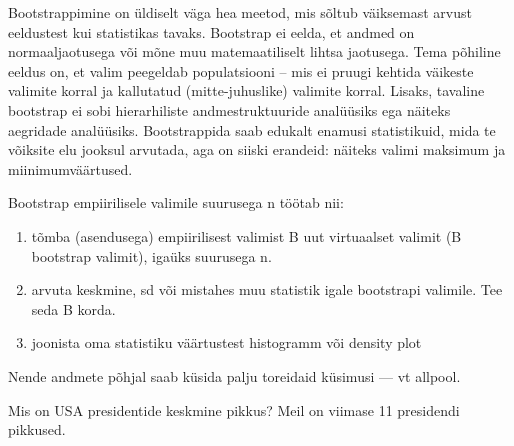 \documentclass[]{book}
\newenvironment{Shaded}{\begin{snugshade}}{\end{snugshade}}
\newcommand{\CommentTok}[1]{\textcolor[rgb]{0.56,0.35,0.01}{\textit{#1}}}
\newcommand{\ControlFlowTok}[1]{\textcolor[rgb]{0.13,0.29,0.53}{\textbf{#1}}}
\newcommand{\DataTypeTok}[1]{\textcolor[rgb]{0.13,0.29,0.53}{#1}}
\newcommand{\DecValTok}[1]{\textcolor[rgb]{0.00,0.00,0.81}{#1}}
\newcommand{\KeywordTok}[1]{\textcolor[rgb]{0.13,0.29,0.53}{\textbf{#1}}}
\newcommand{\NormalTok}[1]{#1}
\newcommand{\OperatorTok}[1]{\textcolor[rgb]{0.81,0.36,0.00}{\textbf{#1}}}
\newcommand{\OtherTok}[1]{\textcolor[rgb]{0.56,0.35,0.01}{#1}}
\newcommand{\StringTok}[1]{\textcolor[rgb]{0.31,0.60,0.02}{#1}}
\providecommand{\tightlist}{%
  \setlength{\itemsep}{0pt}\setlength{\parskip}{0pt}}
\begin{document}
Bootstrappimine on üldiselt väga hea meetod, mis sõltub väiksemast arvust eeldustest kui statistikas tavaks. Bootstrap ei eelda, et andmed on normaaljaotusega või mõne muu matemaatiliselt lihtsa jaotusega. Tema põhiline eeldus on, et valim peegeldab populatsiooni -- mis ei pruugi kehtida väikeste valimite korral ja kallutatud (mitte-juhuslike) valimite korral. Lisaks, tavaline bootstrap ei sobi hierarhiliste andmestruktuuride analüüsiks ega näiteks aegridade analüüsiks.
Bootstrappida saab edukalt enamusi statistikuid, mida te võiksite elu jooksul arvutada, aga on siiski erandeid: näiteks valimi maksimum ja miinimumväärtused.

Bootstrap empiirilisele valimile suurusega n töötab nii:

\begin{enumerate}
\def\labelenumi{\arabic{enumi}.}
\tightlist
\item
  tõmba (asendusega) empiirilisest valimist B uut virtuaalset valimit (B bootstrap valimit), igaüks suurusega n.
\item
  arvuta keskmine, sd või mistahes muu statistik igale bootstrapi valimile. Tee seda B korda.
\item
  joonista oma statistiku väärtustest histogramm või density plot
\end{enumerate}

Nende andmete põhjal saab küsida palju toreidaid küsimusi --- vt allpool.

Mis on USA presidentide keskmine pikkus? Meil on viimase 11 presidendi pikkused.



\begin{Shaded}
\end{Shaded}
\end{document}
